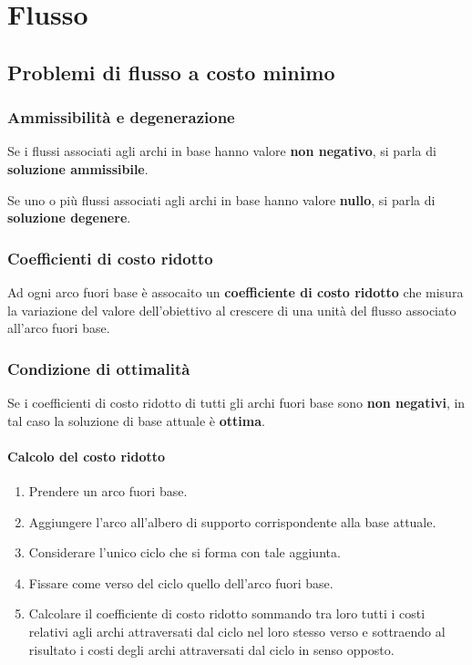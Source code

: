 \chapter{Flusso}

\section{Problemi di flusso a costo minimo}

\subsection{Ammissibilit\`a e degenerazione}

Se i flussi associati agli archi in base hanno valore \textbf{non negativo},
si parla di \textbf{soluzione ammissibile}.


Se uno o pi\`u flussi associati agli archi in base hanno valore \textbf{nullo},
si parla di \textbf{soluzione degenere}.


\subsection{Coefficienti di costo ridotto}

Ad ogni arco fuori base \`e assocaito un \textbf{coefficiente di costo ridotto} che misura
la variazione del valore dell'obiettivo al crescere di una unit\`a del flusso associato all'arco fuori base.



\subsection{Condizione di ottimalit\`a}
Se i coefficienti di costo ridotto di tutti gli archi fuori base sono \textbf{non negativi},
in tal caso la soluzione di base attuale \`e \textbf{ottima}.

\subsubsection{Calcolo del costo ridotto}

\begin{enumerate}
  \item Prendere un arco fuori base.
  \item Aggiungere l'arco all'albero di supporto corrispondente alla base attuale.
  \item Considerare l'unico ciclo che si forma con tale aggiunta.
  \item Fissare come verso del ciclo quello dell'arco fuori base.
  \item Calcolare il coefficiente di costo ridotto sommando tra loro tutti i costi relativi agli archi attraversati dal ciclo nel loro stesso verso e sottraendo al risultato i costi degli archi attraversati dal ciclo in senso opposto.
\end{enumerate}


